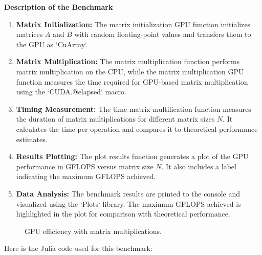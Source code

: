 \begin{center}
   \textbf{Description of the Benchmark}   
\end{center}

\begin{enumerate}
   \item \textbf{Matrix Initialization:} The matrix initialization GPU function initializes matrices \(A\) and \(B\) with random floating-point values and transfers them to the GPU as `CuArray`.
   \item \textbf{Matrix Multiplication:} The matrix multiplication function performs matrix multiplication on the CPU, while the matrix multiplication GPU function measures the time required for GPU-based matrix multiplication using the `CUDA.@elapsed` macro.
   \item \textbf{Timing Measurement:} The time matrix multilication function measures the duration of matrix multiplications for different matrix sizes \(N\). It calculates the time per operation and compares it to theoretical performance estimates.
   \item \textbf{Results Plotting:} The plot results function generates a plot of the GPU performance in GFLOPS versus matrix size \(N\). It also includes a label indicating the maximum GFLOPS achieved.
   \item \textbf{Data Analysis:} The benchmark results are printed to the console and visualized using the `Plots` library. The maximum GFLOPS achieved is highlighted in the plot for comparison with theoretical performance.
\end{enumerate}

\begin{figure}[h]
   \begin{center}
      
\end{center}
\caption{GPU efficiency with matrix multiplications.}
\label{}
\end{figure}
\newpage


Here is the Julia code used for this benchmark:

\begin{comment}
 
\end{comment}

